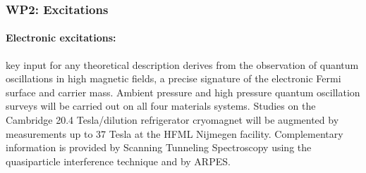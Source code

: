 \subsubsection*{WP2: Excitations}



\paragraph{Electronic excitations:} key input for any
theoretical description derives from the observation of quantum oscillations in high magnetic fields, a precise signature of the electronic Fermi surface and
carrier mass. Ambient pressure and high pressure quantum oscillation surveys will be carried out on all four materials systems.
Studies on the Cambridge 20.4 Tesla/dilution refrigerator cryomagnet will be augmented by measurements up to 37 Tesla at the HFML Nijmegen facility. Complementary information is provided by Scanning Tunneling Spectroscopy using the quasiparticle interference technique and by  ARPES.





